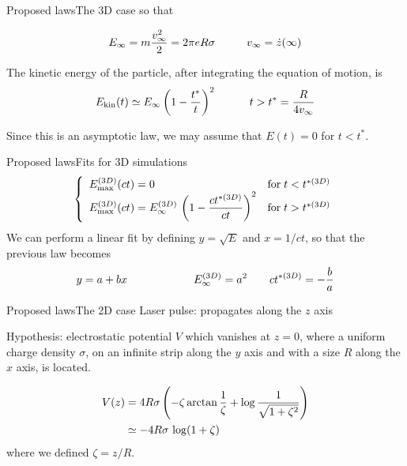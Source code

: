 \documentclass[final]{beamer}
\def\Emax{E_{\mathrm{max}}}
\def\parton#1{\left({{#1}}\right)}
\begin{document}
\begin{frame}{Proposed laws}{The 3D case}
so that

\[ 
   E_\infty= m{v_\infty^2\over 2}=2\pi eR\sigma \hspace{1cm} v_\infty=\dot{z}(\infty) 
\]

The kinetic energy of the particle, after integrating the equation of motion, is
%
\[ E_{\mathrm{kin}}(t) \simeq E_\infty\parton{ 1-{t^*\over t}}^2 \qquad \quad t>t^*
= {R\over 4v_\infty}\]
%

Since this is an asymptotic law, we may assume that $E(t)=0$ for $t<t^*$.
\end{frame}





\begin{frame}{Proposed laws}{Fits for 3D simulations}
\[
\left\{
  \begin{array}{ll}
    \displaystyle \Emax^{(3D)}(ct) = 0                                                   &\mathrm{for}\; t<t^{*(3D)} \\
    \displaystyle \Emax^{(3D)}(ct) = E^{(3D)}_\infty\,\parton{ 1-{ct^{*(3D)}\over ct}}^2 &\mathrm{for}\; t>t^{*(3D)}
  \end{array}
\right.
\]
%
We can perform a linear fit by defining $y=\sqrt{E}$ and $x=1/ct$, so that the previous law
becomes
%
\[ y=a+bx \qquad \qquad \qquad E^{(3D)}_\infty=a^2 \qquad ct^{*(3D)}= -{b\over a} \]
%
\end{frame}



\begin{frame}{Proposed laws}{The 2D case}
Laser pulse: propagates along the $z$ axis

Hypothesis: electrostatic potential $V$ which vanishes at $z=0$, where a uniform charge density $\sigma$, on an infinite strip along the $y$ axis and with a size $R$ along the $x$ axis, is located.

\[
  \begin{split}
    \displaystyle V(z) &= 4R\sigma \parton{-\zeta \arctan {1\over \zeta} +\log{1\over\sqrt{1+\zeta^2}} }\\
    \displaystyle &\simeq -4R\sigma\, \log(1+\zeta)
  \end{split}
\]
where we defined \(\zeta=z/R\).
\end{frame}
\end{document}
